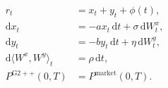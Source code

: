 \documentclass{equation-sheet}
\begin{document}
\begin{equation*}
\begin{aligned}
r_t &= x_t+y_t+\phi(t), \\[0.5em]
\mathrm{d}x_t
  &= -a x_t\,\mathrm{d}t + \sigma\,\mathrm{d}W_t^x, \\[0.5em]
\mathrm{d}y_t
  &= -b y_t\,\mathrm{d}t + \eta\,\mathrm{d}W_t^y, \\[0.5em]
\mathrm{d}\langle W^x,W^y\rangle_t
  &= \rho\,\mathrm{d}t, \\[0.5em]
P^{\mathrm{G2++}}(0,T)
  &= P^{\mathrm{market}}(0,T).
\end{aligned}
\end{equation*}
\end{document}
